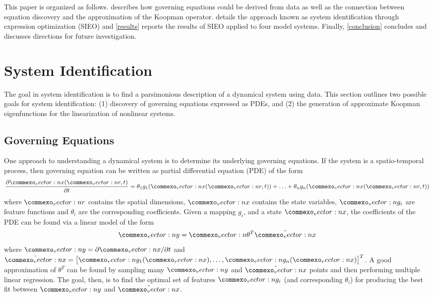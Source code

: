 \documentclass{article}
\renewcommand{\vec}[1]{\vect{#1}}
\begin{document}
This paper is organized as follows.  describes how governing equations could be derived from data as well as the connection between equation discovery and the approximation of the Koopman operator.  details the approach known as system identification through expression optimization (SIEO) and \cref{results} reports the results of SIEO applied to four model systems. Finally, \cref{conclusion} concludes and discusses directions for future investigation. 



\section{System Identification}
\label{systemidentification}

The goal in system identification is to find a parsimonious description of a dynamical system using data. This section outlines two possible goals for system identification: (1) discovery of governing equations expressed as PDEs, and (2) the generation of approximate Koopman eigenfunctions for the linearization of nonlinear systems.

\subsection{Governing Equations}
One approach to understanding a dynamical system is to determine its underlying governing equations. If the system is a spatio-temporal process, then governing equation can be written as partial differential equation (PDE) of the form
\begin{equation}
    \frac{\partial \vec{x} (\vec{r},t)}{\partial t} = \theta_1 g_1(\vec{x}(\vec{r},t)) + \ldots + \theta_n g_n(\vec{x}(\vec{r},t))
\end{equation}
where $\vec{r}$ contains the spatial dimensions, $\vec{x}$ contains the state variables, $\vec{g}_i$ are feature functions and $\theta_i$ are the corresponding coefficients. Given a mapping $g_i$, and a state $\vec{x}$, the coefficients of the PDE can be found via a linear model of the form 
\begin{equation}
 \vec{y} = \vec{\theta}^T \tilde{\vec{x}}
 \end{equation}
where $\vec{y} = \partial \vec{x}/ \partial t$ and $\tilde{\vec{x}} = \begin{bmatrix} \vec{g}_1(\vec{x}), \ldots, \vec{g}_n(\vec{x}) \end{bmatrix}^T$. A good approximation of $\theta^T$ can be found by sampling many $\vec{y}$ and $\tilde{\vec{x}}$ points and then performing multiple linear regression. The goal, then, is to find the optimal set of features $\vec{g}_i$ (and corresponding $\theta_i$) for producing the best fit between $\vec{y}$ and $\tilde{\vec{x}}$.
\end{document}
